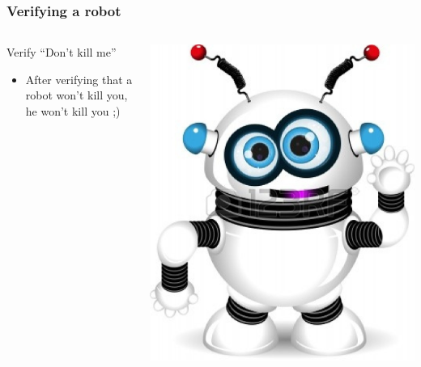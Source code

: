 \documentclass{beamer}
\begin{document}
\begin{frame}
\frametitle{Verifying a robot}

    \begin{columns}[c] %
    \begin{block}{Verify \color{red}``Don't kill me''}
    \begin{itemize}
      \item After verifying that a robot won't kill you, he won't kill you
      ;)
    \end{itemize}
    \end{block}
    \includegraphics[width=\textwidth]{../img/robot}
    \end{columns}
\end{frame}
\end{document}
